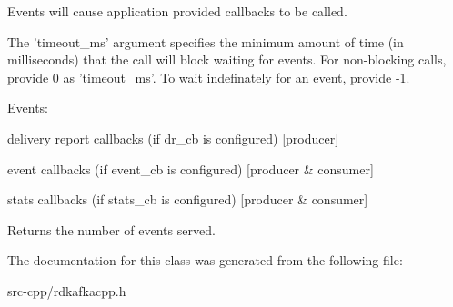Events will cause application provided callbacks to be called.

The 'timeout\-\_\-ms' argument specifies the minimum amount of time (in milliseconds) that the call will block waiting for events. For non-\/blocking calls, provide 0 as 'timeout\-\_\-ms'. To wait indefinately for an event, provide -\/1.

Events\-:
\begin{DoxyItemize}
\item delivery report callbacks (if dr\-\_\-cb is configured) \mbox{[}producer\mbox{]}
\item event callbacks (if event\-\_\-cb is configured) \mbox{[}producer \& consumer\mbox{]}
\item stats callbacks (if stats\-\_\-cb is configured) \mbox{[}producer \& consumer\mbox{]}
\end{DoxyItemize}

Returns the number of events served. 

The documentation for this class was generated from the following file\-:\begin{DoxyCompactItemize}
\item 
src-\/cpp/rdkafkacpp.\-h\end{DoxyCompactItemize}
